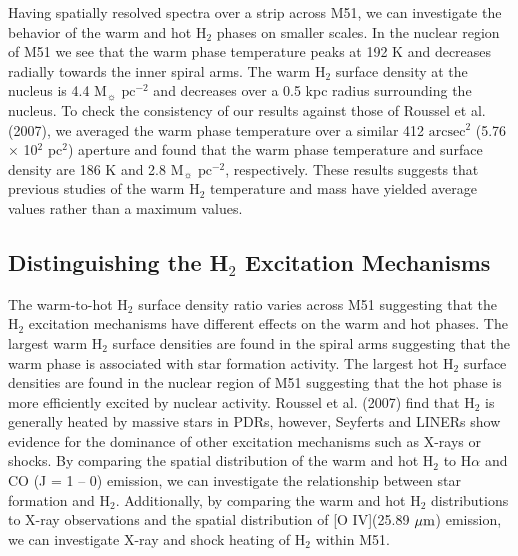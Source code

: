 \documentclass[manuscript]{aastex}
\begin{document}
Having spatially resolved spectra over a strip across M51, we can 
investigate the behavior of the warm and hot H$_2$ phases 
on smaller scales.  In the nuclear region of M51 we see that the 
warm phase temperature peaks at 192 K and decreases 
radially towards the inner spiral arms.  The warm H$_2$ surface 
density at the nucleus is 4.4 $\mathrm{M_\sun}$ $\mathrm{pc^{-2}}$ 
and decreases over a 0.5 kpc radius surrounding the 
nucleus.  To check the consistency of 
our results against those of Roussel et al. (2007), we averaged the 
warm phase temperature over a similar 412 
$\mathrm{arcsec^2}$ (5.76 $\times$ 10$^2$ pc$^2$) aperture and
found that the warm phase temperature and surface density are
186 K and 2.8 $\mathrm{M_\sun}$ $\mathrm{pc^{-2}}$, 
respectively.  These results suggests that previous studies 
of the warm H$_2$ temperature and mass have yielded average 
values rather than a maximum values.

\subsection{Distinguishing the H$_2$ Excitation Mechanisms}

The warm-to-hot H$_2$ surface density ratio varies across 
M51 suggesting that the H$_2$ excitation mechanisms 
have different effects on the warm and hot phases. 
The largest warm H$_2$ surface densities are found in 
the spiral arms suggesting that the warm phase is 
associated with star formation activity.  The largest 
hot H$_2$ surface densities are found in the nuclear 
region of M51 suggesting that the hot phase is more 
efficiently excited by nuclear activity. Roussel et al. (2007) 
find that H$_2$ is generally heated by massive stars in 
PDRs, however, Seyferts and LINERs show evidence for 
the dominance of other excitation mechanisms such as 
X-rays or shocks.  By comparing the spatial distribution 
of the warm and hot H$_2$ to H$\alpha$ and CO 
(J = 1 -- 0) emission, we can investigate the relationship 
between star formation and H$_2$.  Additionally, by 
comparing the warm and hot H$_2$ distributions to X-ray 
observations and the spatial distribution of [O IV](25.89 $\mbox{$\mu$m}$) 
emission, we can investigate X-ray and shock heating 
of H$_2$ within M51.
\end{document}
